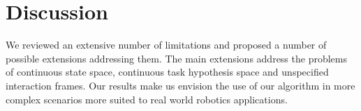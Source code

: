 \section{Discussion}
\label{chapter:limitations:discussion}

We reviewed an extensive number of limitations and proposed a number of possible extensions addressing them. The main extensions address the problems of continuous state space, continuous task hypothesis space and unspecified interaction frames. Our results make us envision the use of our algorithm in more complex scenarios more suited to real world robotics applications.
